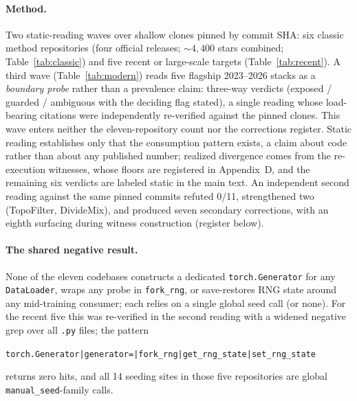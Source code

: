 \documentclass[10pt,letterpaper]{article}
\theoremstyle{remark}
\newcommand{\code}[1]{\texttt{#1}}
\begin{document}
\paragraph{Method.}
Two static-reading waves over shallow clones pinned by commit SHA: six classic
method repositories (four official releases; ${\sim}4{,}400$ stars combined;
Table~\ref{tab:classic}) and five recent or large-scale targets
(Table~\ref{tab:recent}). A third wave (Table~\ref{tab:modern}) reads five
flagship 2023--2026 stacks as a \emph{boundary probe} rather than a prevalence
claim: three-way verdicts (exposed / guarded / ambiguous with the deciding flag
stated), a single reading whose load-bearing citations were independently
re-verified against the pinned clones. This wave enters neither the
eleven-repository count nor the corrections register. Static reading establishes only that the
consumption pattern exists, a claim about code rather than about any published
number; realized divergence comes from the re-execution witnesses, whose floors
are registered in Appendix~D, and the remaining six verdicts are labeled static
in the main text. An independent second reading against the same pinned commits
refuted 0/11, strengthened two (TopoFilter, DivideMix), and produced seven
secondary corrections, with an eighth surfacing during witness construction
(register below).

\paragraph{The shared negative result.}
None of the eleven codebases constructs a dedicated \code{torch.Generator}
for any \code{DataLoader}, wraps any probe in \code{fork\_rng}, or
save-restores RNG state around any mid-training consumer; each relies on a
single global seed call (or none). For the recent five this was re-verified
in the second reading with a widened negative grep over all \code{.py}
files; the pattern
\begin{center}
\code{torch.Generator|generator=|fork\_rng|get\_rng\_state|set\_rng\_state}
\end{center}
returns zero hits, and all 14 seeding sites in those five repositories
are global \code{manual\_seed}-family calls.
\end{document}
